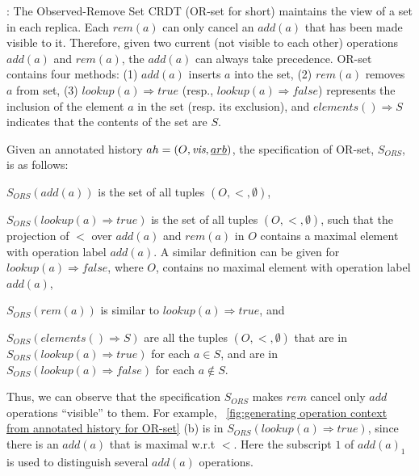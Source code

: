 :
%
The Observed-Remove Set CRDT (OR-set for short)
\cite{Shapiro:2011,Bieniusa:2012} maintains the view of a set in
each replica. Each $\mathit{rem}(a)$ can only cancel an
$\mathit{add}(a)$ that has been made visible to it. Therefore, given
two current (not visible to each other) operations $\mathit{add}(a)$
and $\mathit{rem}(a)$, the $\mathit{add}(a)$ can always take
precedence.
OR-set contains four methods: (1)
$\mathit{add}(a)$ inserts $a$ into the set, (2) $\mathit{rem}(a)$
removes $a$ from set, (3) \mbox{$\mathit{lookup}(a)\Rightarrow
  \mathit{true}$} (resp., \mbox{$\mathit{lookup}(a)\Rightarrow
  \mathit{false}$}) represents the inclusion of the element $a$ in the
set (resp. its exclusion), and $\mathit{elements}() \Rightarrow S$
indicates that the contents of the set are $S$.

Given an annotated history $ah = (O, \textit{vis}, \emph{arb})$, the
specification of OR-set, $S_{\mathit{ORS}}$, is as follows:
\begin{inparaenum}[(1)]
\item $S_{\mathit{ORS}}(\mathit{add}(a))$ is the set of all tuples
  $(O,<,\emptyset)$,
\item $S_{\mathit{ORS}}(\mathit{lookup}(a) \Rightarrow \mathit{true})$
  is the set of all tuples $(O,<,\emptyset)$, such that the projection
  of $<$ over $\mathit{add}(a)$ and $\mathit{rem}(a)$ in $O$ contains a
  maximal element with operation label $\mathit{add}(a)$.
  A similar definition can be given for $\mathit{lookup}(a)
  \Rightarrow \mathit{false}$, where $O$, contains no maximal element
  with operation label $\mathit{add}(a)$,
\item $S_{\mathit{ORS}}(\mathit{rem}(a))$ is similar to
  $\mathit{lookup}(a) \Rightarrow \mathit{true}$, and
\item $S_{\mathit{ORS}}(\mathit{elements}() \Rightarrow S)$ are all
  the tuples $(O,<,\emptyset)$ that are in
  $S_{\mathit{ORS}}(\mathit{lookup}(a) \Rightarrow \mathit{true})$ for
  each $a \in S$, and are in $S_{\mathit{ORS}}(\mathit{lookup}(a)
  \Rightarrow \mathit{false})$ for each $a \notin S$.
 \end{inparaenum}
 Thus, we can observe that the specification $S_{\mathit{ORS}}$ makes
 $\mathit{rem}$ cancel only $\mathit{add}$ operations ``visible'' to
 them.
 For example, \figurename~\ref{fig:generating operation context from annotated history for OR-set} (b) is in $S_{\mathit{ORS}}(\mathit{lookup}(a)
 \Rightarrow \mathit{true})$, since there is an $\mathit{add}(a)$ that
 is maximal w.r.t $<$. Here the subscript $1$ of $\mathit{add}(a)_1$
 is used to distinguish several $\mathit{add}(a)$ operations.

